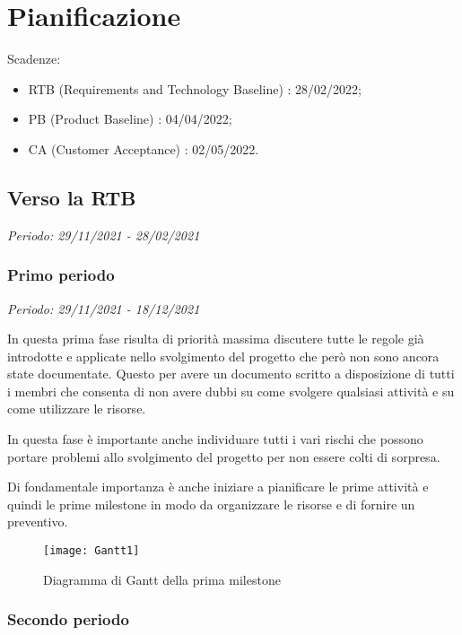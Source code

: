 \chapter{Pianificazione}

Scadenze:
\begin{itemize}
    \item RTB (Requirements and Technology Baseline) : 28/02/2022;
    \item PB (Product Baseline) : 04/04/2022;
    \item CA (Customer Acceptance) : 02/05/2022.
\end{itemize}

\section{Verso la RTB}

\textit{Periodo: 29/11/2021 - 28/02/2021}

\subsection{Primo periodo}

\textit{Periodo: 29/11/2021 - 18/12/2021}

In questa prima fase risulta di priorità massima discutere tutte le regole già introdotte
e applicate nello svolgimento del progetto che però non sono ancora state documentate.
Questo per avere un documento scritto a disposizione di tutti i membri che consenta di
non avere dubbi su come svolgere qualsiasi attività e su come utilizzare le risorse.
\par In questa fase è importante anche individuare tutti i vari rischi che possono portare
problemi allo svolgimento del progetto per non essere colti di sorpresa.
\par Di fondamentale importanza è anche iniziare a pianificare le prime attività e quindi
le prime milestone in modo da organizzare le risorse e di fornire un preventivo. 

\begin{figure}[!ht]
    \texttt{[image: Gantt1]}
    \caption{Diagramma di Gantt della prima milestone} 
\end{figure}

\newpage

\subsection{Secondo periodo}

